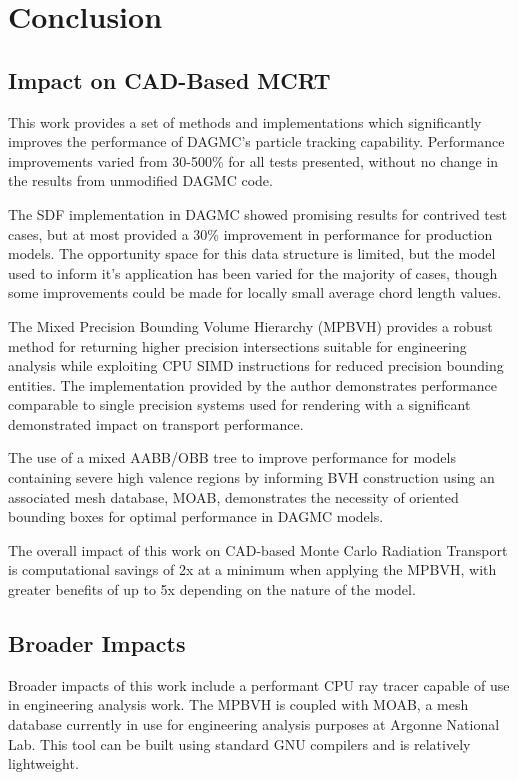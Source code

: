 
\chapter{Conclusion}\label{ch:conclusion}

\section{Impact on CAD-Based MCRT}

This work provides a set of methods and implementations which significantly
improves the performance of DAGMC's particle tracking capability. Performance
improvements varied from 30-500\% for all tests presented, without no change in
the results from unmodified DAGMC code.

The SDF implementation in DAGMC showed promising results for contrived test
cases, but at most provided a 30\% improvement in performance for production
models. The opportunity space for this data structure is limited, but the model
used to inform it's application has been varied for the majority of cases,
though some improvements could be made for locally small average chord length
values.

The Mixed Precision Bounding Volume Hierarchy (MPBVH) provides a robust method
for returning higher precision intersections suitable for engineering analysis
while exploiting CPU SIMD instructions for reduced precision bounding
entities. The implementation provided by the author demonstrates performance
comparable to single precision systems used for rendering with a significant
demonstrated impact on transport performance.

The use of a mixed AABB/OBB tree to improve performance for models containing
severe high valence regions by informing BVH construction using an associated
mesh database, MOAB, demonstrates the necessity of oriented bounding boxes for
optimal performance in DAGMC models.

The overall impact of this work on CAD-based Monte Carlo Radiation Transport is
computational savings of 2x at a minimum when applying the MPBVH, with greater
benefits of up to 5x depending on the nature of the model.

\section{Broader Impacts}\label{sec:other_contrib}

Broader impacts of this work include a performant CPU ray tracer capable of
use in engineering analysis work. The MPBVH is coupled with MOAB, a mesh
database currently in use for engineering analysis purposes at Argonne National
Lab. This tool can be built using standard GNU compilers and is relatively
lightweight.

